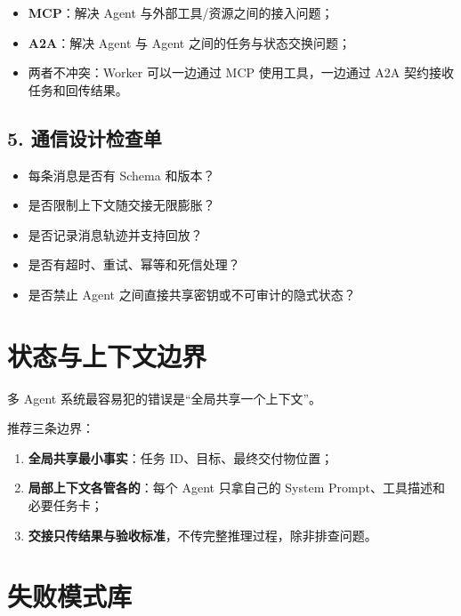 \documentclass[9pt,a4paper,twocolumn]{ctexart}
\begin{document}
\begin{itemize}[itemsep=1pt, topsep=2pt]
  \item \textbf{MCP}：解决 Agent 与外部工具/资源之间的接入问题；
  \item \textbf{A2A}：解决 Agent 与 Agent 之间的任务与状态交换问题；
  \item 两者不冲突：Worker 可以一边通过 MCP 使用工具，一边通过 A2A 契约接收任务和回传结果。
\end{itemize}


\subsection*{5. 通信设计检查单}

\begin{itemize}[itemsep=1pt, topsep=2pt]
  \item 每条消息是否有 Schema 和版本？
  \item 是否限制上下文随交接无限膨胀？
  \item 是否记录消息轨迹并支持回放？
  \item 是否有超时、重试、幂等和死信处理？
  \item 是否禁止 Agent 之间直接共享密钥或不可审计的隐式状态？
\end{itemize}


\section*{状态与上下文边界}


多 Agent 系统最容易犯的错误是“全局共享一个上下文”。



推荐三条边界：


\begin{enumerate}[itemsep=1pt, topsep=2pt]
  \item \textbf{全局共享最小事实}：任务 ID、目标、最终交付物位置；
  \item \textbf{局部上下文各管各的}：每个 Agent 只拿自己的 System Prompt、工具描述和必要任务卡；
  \item \textbf{交接只传结果与验收标准}，不传完整推理过程，除非排查问题。
\end{enumerate}


\section*{失败模式库}
\end{document}
